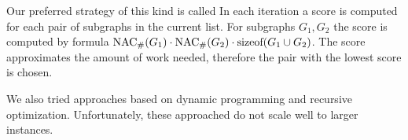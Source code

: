 Our preferred strategy of this kind is called \Score{}
In each iteration a score is computed for each pair of subgraphs in the current list.
For subgraphs \( G_1, G_2 \) the score is computed by formula
\( \operatorname{NAC}_{\#} (G_1) \cdot \operatorname{NAC}_{\#} (G_2) \cdot \text{sizeof}(G_1 \cup G_2) \).
The score approximates the amount of work needed,
therefore the pair with the lowest score is chosen.

We also tried approaches based on dynamic programming and recursive optimization.
Unfortunately, these approached do not scale well to larger instances.
